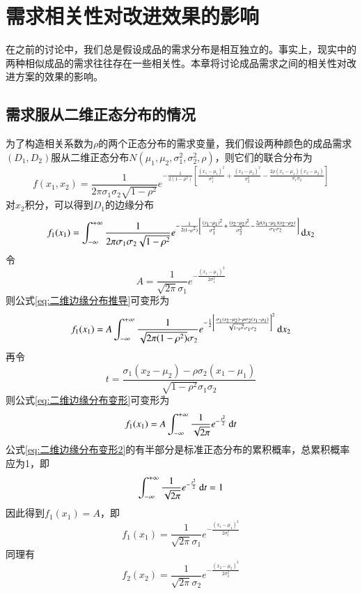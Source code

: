 
\chapter{需求相关性对改进效果的影响}

在之前的讨论中，我们总是假设成品的需求分布是相互独立的。事实上，现实中的两种相似成品的需求往往存在一些相关性。本章将讨论成品需求之间的相关性对改进方案的效果的影响。






\section{需求服从二维正态分布的情况}

为了构造相关系数为$\rho$的两个正态分布的需求变量，我们假设两种颜色的成品需求$(D_1,D_2)$服从二维正态分布$N(\mu_1,\mu_2,\sigma_1^2,\sigma_2^2,\rho)$，则它们的联合分布为
\begin{equation}
f(x_1,x_2) = \frac{1}{2\pi\sigma_1\sigma_2\sqrt{1-\rho^2}}e^{-\frac{1}{2(1-\rho^2)}\left[\frac{(x_1-\mu_1)^2}{\sigma_1^2}+\frac{(x_2-\mu_2)^2}{\sigma_2^2}-\frac{2\rho(x_1-\mu_1)(x_2-\mu_2)}{\sigma_1\sigma_2}\right]}
\label{eq:二维正态分布概率密度}
\end{equation}
对$x_2$积分，可以得到$D_1$的边缘分布
\begin{equation}
f_1(x_1) = \int_{-\infty}^{+\infty}\frac{1}{2\pi\sigma_1\sigma_2\sqrt{1-\rho^2}}e^{-\frac{1}{2(1-\rho^2)}\left[\frac{(x_1-\mu_1)^2}{\sigma_1^2}+\frac{(x_2-\mu_2)^2}{\sigma_2^2}-\frac{2\rho(x_1-\mu_1)(x_2-\mu_2)}{\sigma_1\sigma_2}\right]}\operatorname{d\!} x_2
\label{eq:二维边缘分布推导}
\end{equation}
令
\[
A = \frac{1}{\sqrt{2\pi}\sigma_1}e^{-\frac{(x_1-\mu_1)^2}{2\sigma_1^2}}
\]
则公式\ref{eq:二维边缘分布推导}可变形为
\begin{equation}
f_1(x_1) = A\int_{-\infty}^{+\infty}\frac{1}{\sqrt{2\pi(1-\rho^2)}\sigma_2}e^{-\frac{1}{2}\left[\frac{\sigma_1(x_2-\mu_2)-\rho\sigma_2(x_1-\mu_1)}{\sqrt{1-\rho^2}\sigma_1\sigma_2}\right]^2}\operatorname{d\!} x_2
\label{eq:二维边缘分布变形}
\end{equation}
再令
\[
t = \frac{\sigma_1(x_2-\mu_2)-\rho\sigma_2(x_1-\mu_1)}{\sqrt{1-\rho^2}\sigma_1\sigma_2}
\]
则公式\ref{eq:二维边缘分布变形}可变形为
\begin{equation}
f_1(x_1) = A\int_{-\infty}^{+\infty}\frac{1}{\sqrt{2\pi}}e^{-\frac{t^2}{2}}\operatorname{d\!} t
\label{eq:二维边缘分布变形2}
\end{equation}
公式\ref{eq:二维边缘分布变形2}的有半部分是标准正态分布的累积概率，总累积概率应为1，即
\[
\int_{-\infty}^{+\infty}\frac{1}{\sqrt{2\pi}}e^{-\frac{t^2}{2}}\operatorname{d\!} t = 1
\]
因此得到$f_1(x_1)=A$，即
\begin{equation}
f_1(x_1) = \frac{1}{\sqrt{2\pi}\sigma_1}e^{-\frac{(x_1-\mu_1)^2}{2\sigma_1^2}}
\label{eq:二维边缘分布1}
\end{equation}
同理有
\begin{equation}
f_2(x_2) = \frac{1}{\sqrt{2\pi}\sigma_2}e^{-\frac{(x_2-\mu_2)^2}{2\sigma_2^2}}
\label{eq:二维边缘分布2}
\end{equation}

